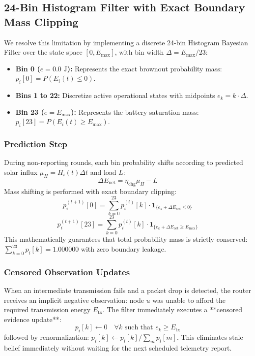 \documentclass[journal]{IEEEtran}
\begin{document}
\subsection{24-Bin Histogram Filter with Exact Boundary Mass Clipping}
We resolve this limitation by implementing a discrete 24-bin Histogram Bayesian Filter over the state space $[0, E_{\max}]$, with bin width $\Delta = E_{\max} / 23$:
\begin{itemize}
    \item \textbf{Bin 0 ($e = 0.0\text{ J}$):} Represents the exact brownout probability mass: $p_i[0] = P(E_i(t) \le 0)$.
    \item \textbf{Bins 1 to 22:} Discretize active operational states with midpoints $e_k = k \cdot \Delta$.
    \item \textbf{Bin 23 ($e = E_{\max}$):} Represents the battery saturation mass: $p_i[23] = P(E_i(t) \ge E_{\max})$.
\end{itemize}

\subsubsection{Prediction Step}
During non-reporting rounds, each bin probability shifts according to predicted solar influx $\mu_H = H_i(t)\Delta t$ and load $L$:
\begin{equation}
\Delta E_{\text{net}} = \eta_{\text{chg}} \mu_H - L
\end{equation}
Mass shifting is performed with exact boundary clipping:
\begin{equation}
p_i^{(t+1)}[0] = \sum_{k=0}^{23} p_i^{(t)}[k] \cdot \mathbf{1}_{\{e_k + \Delta E_{\text{net}} \le 0\}}
\end{equation}
\begin{equation}
p_i^{(t+1)}[23] = \sum_{k=0}^{23} p_i^{(t)}[k] \cdot \mathbf{1}_{\{e_k + \Delta E_{\text{net}} \ge E_{\max}\}}
\end{equation}
This mathematically guarantees that total probability mass is strictly conserved: $\sum_{k=0}^{23} p_i[k] = 1.000000$ with zero boundary leakage.

\subsubsection{Censored Observation Updates}
When an intermediate transmission fails and a packet drop is detected, the router receives an implicit negative observation: node $u$ was unable to afford the required transmission energy $E_{\text{tx}}$. The filter immediately executes a **censored evidence update**:
\begin{equation}
p_i[k] \leftarrow 0 \quad \forall k \text{ such that } e_k \ge E_{\text{tx}}
\end{equation}
followed by renormalization: $p_i[k] \leftarrow p_i[k] / \sum_m p_i[m]$. This eliminates stale belief immediately without waiting for the next scheduled telemetry report.
\end{document}
